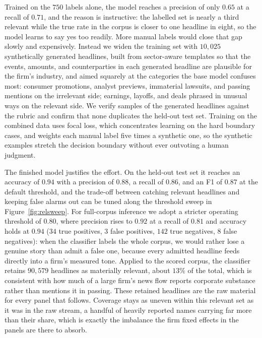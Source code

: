 \documentclass[conference]{IEEEtran}
\begin{document}
Trained on the $750$ labels alone, the model reaches a precision of only $0.65$ at a
recall of $0.71$, and the reason is instructive: the labelled set is nearly a third
relevant while the true rate in the corpus is closer to one headline in eight, so
the model learns to say yes too readily. More manual labels would close that gap
slowly and expensively. Instead we widen the training set with $10{,}025$
synthetically generated headlines, built from sector-aware templates so that the
events, amounts, and counterparties in each generated headline are plausible for the
firm's industry, and aimed squarely at the categories the base model confuses most:
consumer promotions, analyst previews, immaterial lawsuits, and passing mentions on
the irrelevant side; earnings, layoffs, and deals phrased in unusual ways on the
relevant side. We verify samples of the generated headlines against the rubric and
confirm that none duplicates the held-out test set. Training on the combined data
uses focal loss, which concentrates learning on the hard boundary cases, and weights
each manual label five times a synthetic one, so the synthetic examples stretch the
decision boundary without ever outvoting a human judgment.

The finished model justifies the effort. On the held-out test set it reaches an
accuracy of $0.94$ with a precision of $0.88$, a recall of $0.86$, and an F1 of
$0.87$ at the default threshold, and the trade-off between catching relevant
headlines and keeping false alarms out can be tuned along the threshold sweep in
Figure~\ref{fig:relsweep}. For full-corpus inference we adopt a stricter operating
threshold of $0.80$, where precision rises to $0.92$ at a recall of $0.81$ and
accuracy holds at $0.94$ ($34$ true positives, $3$ false positives, $142$ true
negatives, $8$ false negatives): when the classifier labels the whole corpus, we
would rather lose a genuine story than admit a false one, because every admitted
headline feeds directly into a firm's measured tone. Applied to the scored corpus,
the classifier retains $90{,}579$ headlines as materially relevant, about $13\%$ of
the total, which is consistent with how much of a large firm's news flow reports
corporate substance rather than mentions it in passing. These retained headlines are
the raw material for every panel that follows. Coverage stays as uneven within this
relevant set as it was in the raw stream, a handful of heavily reported names carrying
far more than their share, which is exactly the imbalance the firm fixed effects in the
panels are there to absorb.
\end{document}
